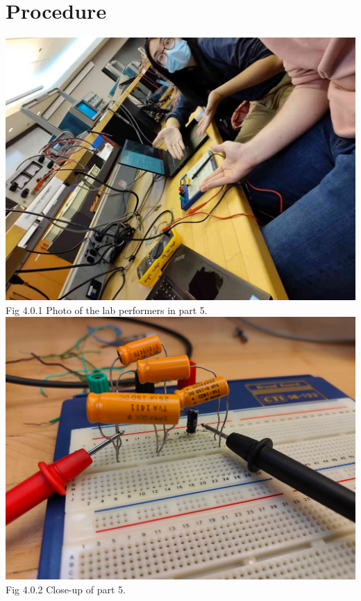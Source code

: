 \documentclass[titlepage]{article}
\begin{document}
	\section{Procedure}
\begin{center}
	\vspace{1cm}
	\includegraphics[scale=0.2]{selfies/selfie-part5.jpg}\\
	Fig 4.0.1 Photo of the lab performers in part 5.\\
	\vspace{1cm}
	\includegraphics[scale=0.14]{selfies/part-5.png}\\
	Fig 4.0.2 Close-up of part 5.\\
	\vspace{1cm}

\end{center}
\end{document}
